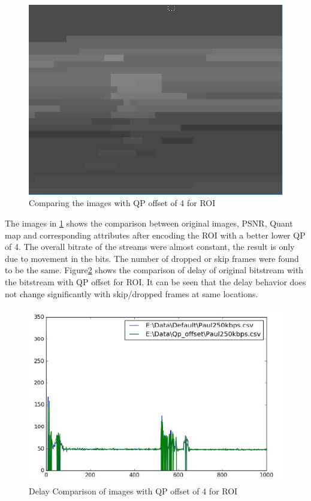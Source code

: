 \documentclass[11pt]{article} %
\begin{document}
\begin{figure}[!h]
    \includegraphics[scale=0.4]{QPOffset/paul120_250kbps_QPoffset4_quant}    
    \caption{Comparing the images with QP offset of 4 for ROI}
    \label{fig:Default_QPOffsetCompare}
\end{figure}

The images in \ref{fig:Default_QPOffsetCompare} shows the comparison between original images, PSNR, Quant map and corresponding attributes after encoding the ROI with a better lower QP of 4. The overall bitrate of the streams were almost constant, the result is only due to movement in the bits. The number of dropped or skip frames were found to be the same. Figure\ref{fig:DelayDefault_QPOffsetCompare} shows the comparison of delay of original bitstream with the bitstream with QP offset for ROI. It can be seen that the delay behavior does not change significantly with skip/dropped frames at same locations.
\begin{figure}[!h]
    \centering
    \includegraphics[scale=0.75]{QPOffset/Paul250kbps_QP_Offset_Delay}
    \caption{Delay Comparison of images with QP offset of 4 for ROI}
    \label{fig:DelayDefault_QPOffsetCompare}
\end{figure}
\end{document}

